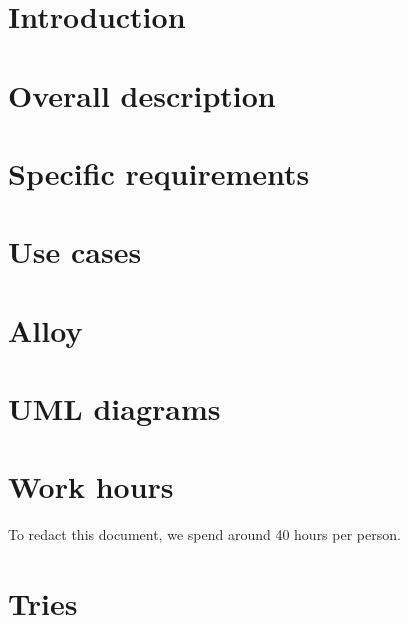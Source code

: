\tableofcontents

\chapter{Introduction}



\chapter{Overall description}


\chapter{Specific requirements}


\begin{appendices}
\chapter{Use cases}


\chapter{Alloy}


\chapter{UML diagrams}


\chapter{Work hours}
To redact this document, we spend around 40 hours per person.

\chapter{Tries}
%    
%
%

\end{appendices}

